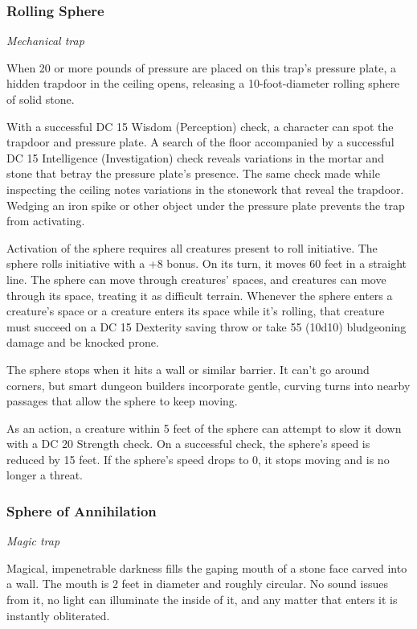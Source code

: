 \documentclass[
]{article}
\begin{document}
\hypertarget{rolling-sphere}{%
\subsubsection{Rolling Sphere}\label{rolling-sphere}}

\emph{Mechanical trap}

When 20 or more pounds of pressure are placed on this trap's pressure
plate, a hidden trapdoor in the ceiling opens, releasing a
10-foot-diameter rolling sphere of solid stone.

With a successful DC 15 Wisdom (Perception) check, a character can spot
the trapdoor and pressure plate. A search of the floor accompanied by a
successful DC 15 Intelligence (Investigation) check reveals variations
in the mortar and stone that betray the pressure plate's presence. The
same check made while inspecting the ceiling notes variations in the
stonework that reveal the trapdoor. Wedging an iron spike or other
object under the pressure plate prevents the trap from activating.

Activation of the sphere requires all creatures present to roll
initiative. The sphere rolls initiative with a +8 bonus. On its turn, it
moves 60 feet in a straight line. The sphere can move through creatures'
spaces, and creatures can move through its space, treating it as
difficult terrain. Whenever the sphere enters a creature's space or a
creature enters its space while it's rolling, that creature must succeed
on a DC 15 Dexterity saving throw or take 55 (10d10) bludgeoning damage
and be knocked prone.

The sphere stops when it hits a wall or similar barrier. It can't go
around corners, but smart dungeon builders incorporate gentle, curving
turns into nearby passages that allow the sphere to keep moving.

As an action, a creature within 5 feet of the sphere can attempt to slow
it down with a DC 20 Strength check. On a successful check, the sphere's
speed is reduced by 15 feet. If the sphere's speed drops to 0, it stops
moving and is no longer a threat.

\hypertarget{sphere-of-annihilation}{%
\subsubsection{Sphere of Annihilation}\label{sphere-of-annihilation}}

\emph{Magic trap}

Magical, impenetrable darkness fills the gaping mouth of a stone face
carved into a wall. The mouth is 2 feet in diameter and roughly
circular. No sound issues from it, no light can illuminate the inside of
it, and any matter that enters it is instantly obliterated.
\end{document}
